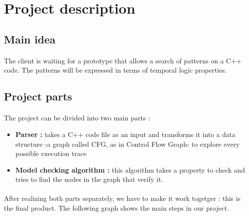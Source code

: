 \documentclass{report}
\begin{document}
\section{Project description}

\subsection{Main idea}

\paragraph{}
\hspace{4mm}\textnormal{The client is waiting for a prototype that allows a search of patterns on a C++ code. The patterns will be expressed in terms of temporal logic properties.}

\subsection{Project parts}

\paragraph{}
\hspace{4mm}\textnormal{The project can be divided into two main parts :}

\vspace{4mm}
\begin{itemize}
\item \textbf{Parser :} takes a C++ code file as an input and transforms it into a data structure -a graph called CFG, as in Control Flow Graph- to explore every possible execution trace\vspace{1mm}
\item \textbf{Model checking algorithm :} this algorithm takes a property to check and tries to find the nodes in the graph that verify it.\vspace{1mm}
\end{itemize}

\paragraph{}
\hspace{4mm}\textnormal{After realizing both parts separately, we have to make it work togetger : this is the final product.
The following graph shows the main steps in our project.}
\end{document}
